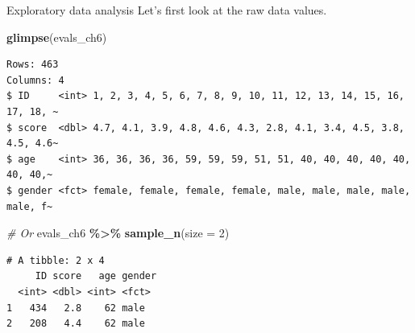 \documentclass[
  ignorenonframetext,
]{beamer}
\newenvironment{Shaded}{\begin{snugshade}}{\end{snugshade}}
\newcommand{\AttributeTok}[1]{\textcolor[rgb]{0.13,0.29,0.53}{#1}}
\newcommand{\CommentTok}[1]{\textcolor[rgb]{0.56,0.35,0.01}{\textit{#1}}}
\newcommand{\DecValTok}[1]{\textcolor[rgb]{0.00,0.00,0.81}{#1}}
\newcommand{\FunctionTok}[1]{\textcolor[rgb]{0.13,0.29,0.53}{\textbf{#1}}}
\newcommand{\NormalTok}[1]{#1}
\newcommand{\SpecialCharTok}[1]{\textcolor[rgb]{0.81,0.36,0.00}{\textbf{#1}}}
\begin{document}
\begin{frame}[fragile]{Exploratory data analysis}
\protect\hypertarget{exploratory-data-analysis-9}{}
Let's first look at the raw data values.

\small

\begin{Shaded}
\begin{Highlighting}[]
\FunctionTok{glimpse}\NormalTok{(evals\_ch6)}
\end{Highlighting}
\end{Shaded}

\begin{verbatim}
Rows: 463
Columns: 4
$ ID     <int> 1, 2, 3, 4, 5, 6, 7, 8, 9, 10, 11, 12, 13, 14, 15, 16, 17, 18, ~
$ score  <dbl> 4.7, 4.1, 3.9, 4.8, 4.6, 4.3, 2.8, 4.1, 3.4, 4.5, 3.8, 4.5, 4.6~
$ age    <int> 36, 36, 36, 36, 59, 59, 59, 51, 51, 40, 40, 40, 40, 40, 40, 40,~
$ gender <fct> female, female, female, female, male, male, male, male, male, f~
\end{verbatim}

\begin{Shaded}
\begin{Highlighting}[]
\CommentTok{\# Or}
\NormalTok{evals\_ch6 }\SpecialCharTok{\%\textgreater{}\%} 
  \FunctionTok{sample\_n}\NormalTok{(}\AttributeTok{size =} \DecValTok{2}\NormalTok{)}
\end{Highlighting}
\end{Shaded}

\begin{verbatim}
# A tibble: 2 x 4
     ID score   age gender
  <int> <dbl> <int> <fct> 
1   434   2.8    62 male  
2   208   4.4    62 male  
\end{verbatim}

\normalsize
\end{frame}
\end{document}
